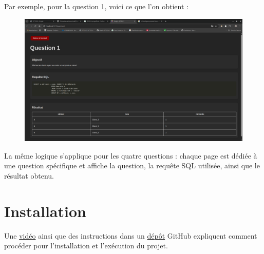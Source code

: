 \documentclass{article}
\begin{document}
Par exemple, pour la question 1, voici ce que l’on obtient : 
\begin{figure}[H]
    \centering
    \includegraphics[width=1\textwidth]{projetQuestion1.png}
    \label{fig:}
\end{figure}

La même logique s’applique pour les quatre questions : chaque page est dédiée à une question spécifique et affiche la question, la requête SQL utilisée, ainsi que le résultat obtenu.

\section{Installation}
Une \href{file:./promenade_projet_ift_2935_groupe_20.mp4}{vidéo} ainsi que des instructions dans un \href{https://github.com/OlivierLarueUmontreal/ProjetIFT2935}{dépôt} GitHub expliquent comment procéder pour l'installation et l'exécution du projet.
\end{document}
